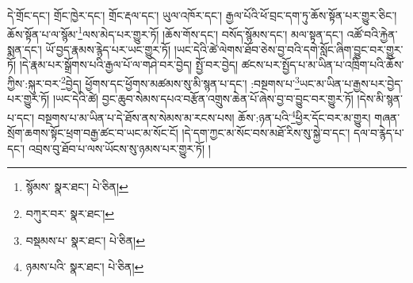 དེ་གྲོང་དང་། གྲོང་ཁྱེར་དང་། གྲོང་རྡལ་དང་། ཡུལ་འཁོར་དང་། རྒྱལ་པོའི་ཕོ་བྲང་དག་ཏུ་ཆོས་སྟོན་པར་གྱུར་ཅིང་། ཆོས་སྟོན་པ་ལ་སྙོམ་\footnote{སྙོམས་  སྣར་ཐང་།  པེ་ཅིན། }ལས་མེད་པར་གྱུར་ཏོ། །ཆོས་གོས་དང་། བསོད་སྙོམས་དང་། མལ་སྟན་དང་། འཚོ་བའི་རྐྱེན་སྨན་དང་། ཡོ་བྱད་རྣམས་རྙེད་པར་ཡང་གྱུར་ཏོ། །ཡང་དེའི་ཚེ་ལེགས་ཐོབ་ཅེས་བྱ་བའི་དགེ་སློང་ཞིག་བྱུང་བར་གྱུར་ཏོ། །དེ་རྣམ་པར་སྒྲོགས་པའི་རྒྱལ་པོ་ལ་གཤེ་བར་བྱེད། སྤྱོ་བར་བྱེད། ཚངས་པར་སྤྱོད་པ་མ་ཡིན་པ་འཁྲིག་པའི་ཆོས་ཀྱིས་:སྐུར་བར་\footnote{བཀུར་བར་  སྣར་ཐང་། }བྱེད། ཕྱོགས་དང་ཕྱོགས་མཚམས་སུ་མི་སྙན་པ་དང་། :བསྔགས་པ་\footnote{བསྡམས་པ་  སྣར་ཐང་།  པེ་ཅིན། }ཡང་མ་ཡིན་པ་རྒྱས་པར་བྱེད་པར་གྱུར་ཏོ། །ཡང་དེའི་ཚེ། བྱང་ཆུབ་སེམས་དཔའ་བརྩོན་འགྲུས་ཆེན་པོ་ཞེས་བྱ་བ་བྱུང་བར་གྱུར་ཏོ། །དེས་མི་སྙན་པ་དང་། བསྔགས་པ་མ་ཡིན་པ་དེ་ཐོས་ནས་སེམས་མ་རངས་པས། ཆོས་:ཉན་པའི་\footnote{ཉམས་པའི་  སྣར་ཐང་།  པེ་ཅིན། }ཕྱིར་དོང་བར་མ་གྱུར། གཞན་སྲོག་ཆགས་སྟོང་ཕྲག་བརྒྱ་ཚང་བ་ཡང་མ་སོང་ངོ། །དེ་དག་ཀྱང་མ་སོང་བས་མཐོ་རིས་སུ་སྐྱེ་བ་དང་། དལ་བ་རྙེད་པ་དང་། འབྲས་བུ་ཐོབ་པ་ལས་ཡོངས་སུ་ཉམས་པར་གྱུར་ཏོ། །
